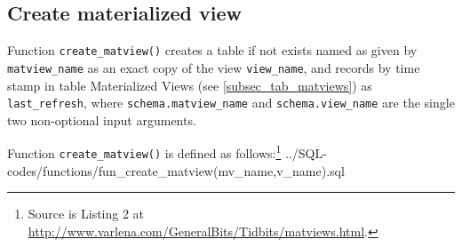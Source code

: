 \subsection{Create materialized view}\label{subsec_fun_create_matview}

Function \texttt{create\_matview()} creates a table if not exists named as given by \texttt{matview\_name} as an exact copy of the view \texttt{view\_name}, and records by time stamp in table Materialized Views (see \ref{subsec_tab_matviews}) as \texttt{last\_refresh},
where \texttt{schema.matview\_name} and \texttt{schema.view\_name} are the single two non-optional input arguments.

Function \texttt{create\_matview()} is defined as follows:\footnote{Source is Listing 2 at \url{http://www.varlena.com/GeneralBits/Tidbits/matviews.html}.} 
%
{../SQL-codes/functions/fun_create_matview(mv_name,v_name).sql}
